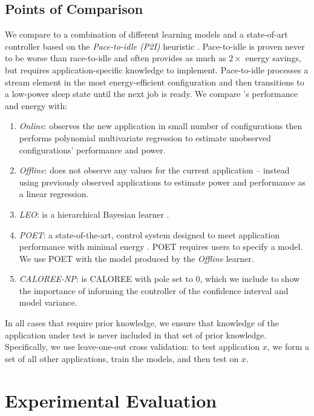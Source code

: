 \subsection{Points of Comparison}
We compare \SYSTEM{} to a combination of different learning models
and a state-of-art controller based on the \emph{Pace-to-idle (P2I)}
heuristic \cite{kim-cpsna}.  Pace-to-idle is proven never to be worse
than race-to-idle and often provides as much as $2\times$ energy
savings, but requires application-specific knowledge to implement.
Pace-to-idle processes a stream element in the most energy-efficient
configuration and then transitions to a low-power sleep state until
the next job is ready.  We compare \SYSTEM{}'s performance and energy
with:
\begin{enumerate}
\item \textit{Online}: observes the new application in small number of
  configurations then performs polynomial multivariate regression to
  estimate unobserved configurations' performance and power. 
\item \textit{Offline}: does not observe any values for the current
  application -- instead using previously observed applications to
  estimate power and performance as a linear regression. 
\item \textit{LEO}: is a hierarchical Bayesian learner \cite{LEO}.
\item \textit{POET}: a state-of-the-art, control system designed to
  meet application performance with minimal energy \cite{POET}.  POET
  requires users to specify a model.  We use POET with the model
  produced by the \emph{Offline} learner.
\item \textit{CALOREE-NP}: is CALOREE with pole set to 0, which we
  include to show the importance of informing the controller of the
  confidence interval and model variance.
\end{enumerate}

In all cases that require prior knowledge, we ensure that knowledge of
the application under test is never included in that set of prior
knowledge.  Specifically, we use leave-one-out cross validation: to
test application $x$, we form a set of all other applications, train
the models, and then test on $x$.


\section{Experimental Evaluation}


